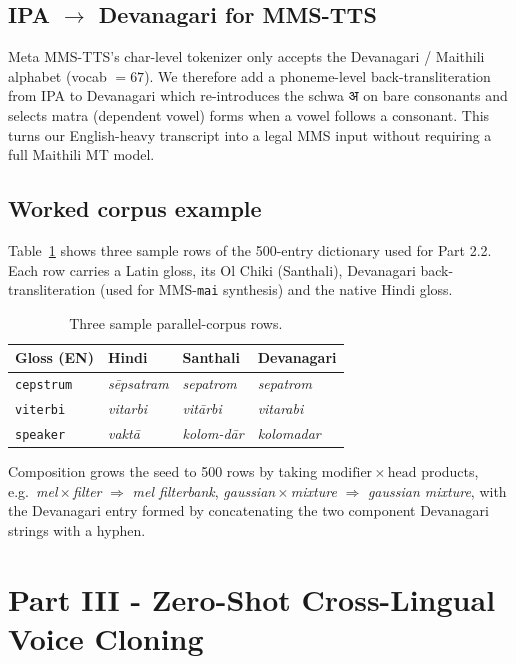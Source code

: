 \documentclass[conference]{IEEEtran}
\begin{document}
\subsection{IPA $\to$ Devanagari for MMS-TTS}
Meta MMS-TTS's char-level tokenizer only accepts the Devanagari /
Maithili alphabet (vocab $=67$). We therefore add a phoneme-level
back-transliteration from IPA to Devanagari which re-introduces the
schwa $\text{अ}$ on bare consonants and selects matra (dependent
vowel) forms when a vowel follows a consonant. This turns our
English-heavy transcript into a legal MMS input without requiring a
full Maithili MT model.

\subsection{Worked corpus example}
Table~\ref{tab:corpus} shows three sample rows of the
500-entry dictionary \cite{statement} used for Part 2.2. Each row
carries a Latin gloss, its Ol Chiki (Santhali), Devanagari
back-transliteration (used for MMS-\texttt{mai} synthesis) and the
native Hindi gloss.

\begin{table}[h]
\caption{Three sample parallel-corpus rows.}
\label{tab:corpus}
\centering
\begin{tabular}{@{}llll@{}}
\toprule
Gloss (EN) & Hindi & Santhali & Devanagari \\
\midrule
\texttt{cepstrum}   & \textit{s\={e}psatram}  & \textit{sepatrom}  & \textit{sepatrom} \\
\texttt{viterbi}    & \textit{vitarbi}        & \textit{vit\={a}rbi}  & \textit{vitarabi} \\
\texttt{speaker}    & \textit{vakt\={a}}      & \textit{kolom-d\={a}r} & \textit{kolomadar}\\
\bottomrule
\end{tabular}
\end{table}

Composition grows the seed to 500 rows by taking
$\mathrm{modifier}\times\mathrm{head}$ products, e.g.\
\textit{mel}\,$\times$\,\textit{filter}
$\Rightarrow$ \textit{mel filterbank},
\textit{gaussian}\,$\times$\,\textit{mixture}
$\Rightarrow$ \textit{gaussian mixture}, with
the Devanagari entry formed by concatenating the two component
Devanagari strings with a hyphen.

\section{Part III - Zero-Shot Cross-Lingual Voice Cloning}
\end{document}
